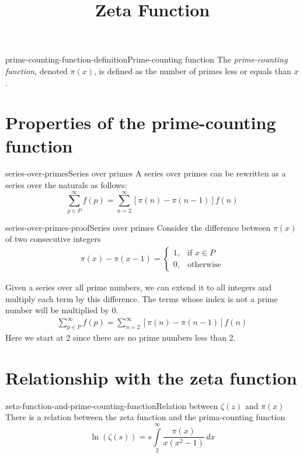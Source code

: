 \documentclass[preview]{standalone}
\begin{document}
\title{Zeta Function}
\genpage


\begin{snippetdefinition}{prime-counting-function-definition}{Prime-counting function}
    The \textit{prime-counting function}, denoted \(\pi(x)\),
    is defined as the number of primes less or equals than \(x\).
\end{snippetdefinition}

\section{Properties of the prime-counting function}

\begin{snippetproposition}{series-over-primes}{Series over primes}
    A series over primes can be rewritten as a series over the naturals as follows:
    \[
        \sum_{p\in P}^{\infty}f(p)=\sum_{n=2}^{\infty}\left[\pi(n)-\pi(n-1)\right]f(n)
    \]
\end{snippetproposition}

\begin{snippetproof}{series-over-primes-proof}{Series over primes}
    Consider the difference between \(\pi(x)\) of two consecutive integers
    \begin{align*}
        \pi (x)-\pi (x-1)= 
        \begin{cases}
            1,& \text{if } x\in P
            \\
            0,& \text{otherwise}
        \end{cases}
    \end{align*}

    Given a series over all prime numbers, we can extend it to all integers and multiply each term by this difference.
    The terms whose index is not a prime number will be multiplied by 0.
    \begin{align*}
        \sum_{p\in P}^{\infty}f(p)=\sum_{n=2}^{\infty}\left[\pi(n)-\pi(n-1)\right]f(n)
    \end{align*}
    Here we start at 2 since there are no prime numbers less than 2.
\end{snippetproof}

\section{Relationship with the zeta function}

\begin{snippettheorem}{zeta-function-and-prime-counting-function}{Relation between \(\zeta(z)\) and \(\pi(x)\)}
    There is a relation between the zeta function and the prima-counting function
    \[
        \ln\left(\zeta(s)\right)=
        s\int\limits_2^\infty
        \frac{\pi(x)}{x(x^2-1)}\,dx
    \]
\end{snippettheorem}
\end{document}
